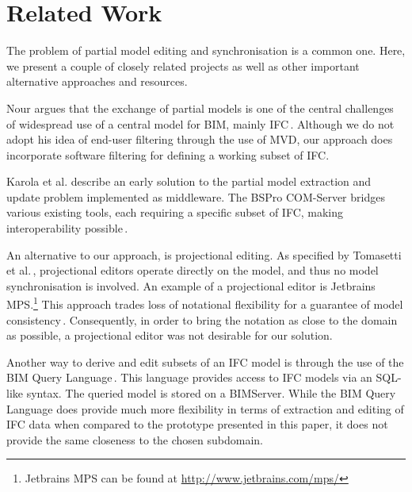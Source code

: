 \section{Related Work}
\label{sec:related_work}
The problem of partial model editing and synchronisation is a common one. Here, we present a couple of closely related projects as well as other important alternative approaches and resources.

Nour argues that the exchange of partial models is one of the central challenges of widespread use of a central model for BIM, mainly IFC\,\cite{nour08}. Although we do not adopt his idea of end-user filtering through the use of MVD, our approach does incorporate software filtering for defining a working subset of IFC.

Karola et al. describe an early solution to the partial model extraction and update problem implemented as middleware. The BSPro COM-Server bridges various existing tools, each requiring a specific subset of IFC, making interoperability possible\,\cite{karola02}.

An alternative to our approach, is projectional editing. As specified by Tomasetti et al.\,\cite{tomasetti11}, projectional editors operate directly on the model, and thus no model synchronisation is involved. An example of a projectional editor is Jetbrains MPS.\footnote{Jetbrains MPS can be found at \url{http://www.jetbrains.com/mps/}} This approach trades loss of notational flexibility for a guarantee of model consistency\,\cite{conf/models/Voelter10}. Consequently, in order to bring the notation as close to the domain as possible, a projectional editor was not desirable for our solution.

Another way to derive and edit subsets of an IFC model is through the use of the BIM Query Language\,\cite{mazairac10}. This language provides access to IFC models via an SQL-like syntax. The queried model is stored on a BIMServer. While the BIM Query Language does provide much more flexibility in terms of extraction and editing of IFC data when compared to the prototype presented in this paper, it does not provide the same closeness to the chosen subdomain.

